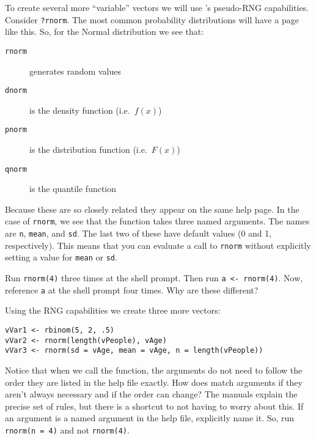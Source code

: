 To create several more ``variable'' vectors we will use \R{}'s
pseudo-RNG capabilities. Consider \texttt{?rnorm}. The most common
probability distributions will have a page like this. So, for the
Normal distribution we see that:
\begin{description}
  \item[\texttt{rnorm}] generates random values
  \item[\texttt{dnorm}] is the density function (i.e.\ $f(x)$)
  \item[\texttt{pnorm}] is the distribution function (i.e.\ $F(x)$)
  \item[\texttt{qnorm}] is the quantile function
\end{description}
Because these are so closely related they appear on the same help
page. In the case of \texttt{rnorm}, we see that the function takes
three named arguments. The names are \texttt{n}, \texttt{mean}, and
\texttt{sd}. The last two of these have default values (0 and 1,
respectively). This means that you can evaluate a call to
\texttt{rnorm} without explicitly setting a value for \texttt{mean} or
\texttt{sd}.

Run \texttt{rnorm(4)} three times at the shell prompt. Then run
\verb=a <- rnorm(4)=. Now, reference \texttt{a} at the shell prompt
four times. Why are these different?

Using the RNG capabilities we create three more vectors:
\begin{verbatim}
vVar1 <- rbinom(5, 2, .5)
vVar2 <- rnorm(length(vPeople), vAge)
vVar3 <- rnorm(sd = vAge, mean = vAge, n = length(vPeople))
\end{verbatim}
Notice that when we call the function, the arguments do not need to
follow the order they are listed in the help file exactly. How does
\R{} match arguments if they aren't always necessary and if the order
can change? The \R{} manuals explain the precise set of rules, but
there is a shortcut to not having to worry about this. If an argument
is a named argument in the help file, explicitly name it. So, run
\texttt{rnorm(n = 4)} and not \texttt{rnorm(4)}.

